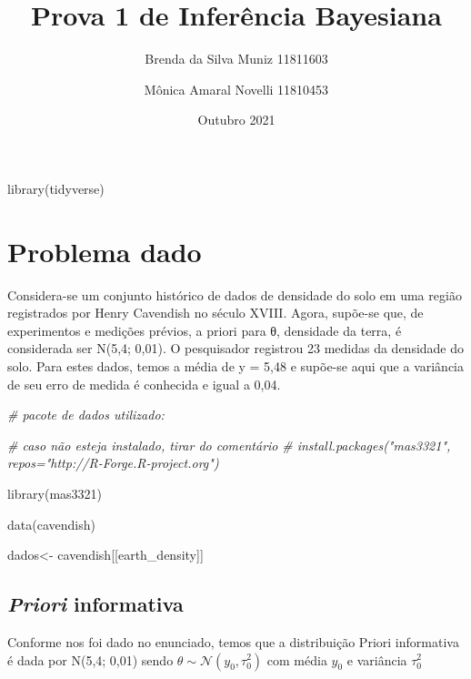 \documentclass[
]{article}
\title{Prova 1 de Inferência Bayesiana}
\author{Brenda da Silva Muniz 11811603 \and Mônica Amaral Novelli
11810453}
\date{Outubro 2021}
\newenvironment{Shaded}{\begin{snugshade}}{\end{snugshade}}
\newcommand{\CommentTok}[1]{\textcolor[rgb]{0.56,0.35,0.01}{\textit{#1}}}
\newcommand{\FunctionTok}[1]{\textcolor[rgb]{0.00,0.00,0.00}{#1}}
\newcommand{\NormalTok}[1]{#1}
\newcommand{\OtherTok}[1]{\textcolor[rgb]{0.56,0.35,0.01}{#1}}
\newcommand{\StringTok}[1]{\textcolor[rgb]{0.31,0.60,0.02}{#1}}
\begin{document}
\maketitle

\begin{Shaded}
\begin{Highlighting}[]
\FunctionTok{library}\NormalTok{(tidyverse)}
\end{Highlighting}
\end{Shaded}

\hypertarget{problema-dado}{%
\section{Problema dado}\label{problema-dado}}

Considera-se um conjunto histórico de dados de densidade do solo em uma
região registrados por Henry Cavendish no século XVIII. Agora, supõe-se
que, de experimentos e medições prévios, a priori para θ, densidade da
terra, é considerada ser N(5,4; 0,01). O pesquisador registrou 23
medidas da densidade do solo. Para estes dados, temos a média de y =
5,48 e supõe-se aqui que a variância de seu erro de medida é conhecida e
igual a 0,04.

\begin{Shaded}
\begin{Highlighting}[]
\CommentTok{\# pacote de dados utilizado:}

\CommentTok{\# caso não esteja instalado, tirar do comentário}
\CommentTok{\# install.packages("mas3321", repos="http://R{-}Forge.R{-}project.org")}

\FunctionTok{library}\NormalTok{(mas3321)}

\FunctionTok{data}\NormalTok{(cavendish)}

\NormalTok{dados}\OtherTok{\textless{}{-}}\NormalTok{ cavendish[[}\StringTok{\textquotesingle{}earth\_density\textquotesingle{}}\NormalTok{]]}
\end{Highlighting}
\end{Shaded}

\hypertarget{priori-informativa}{%
\subsection{\texorpdfstring{\emph{Priori}
informativa}{Priori informativa}}\label{priori-informativa}}

Conforme nos foi dado no enunciado, temos que a distribuição Priori
informativa é dada por N(5,4; 0,01) sendo
\(\theta \sim \mathcal{N}(y_0, \tau_0^2)\) com média \(y_0\) e variância
\(\tau_0^2\)
\end{document}
